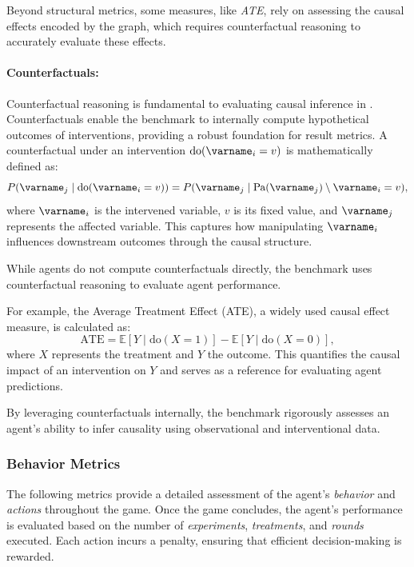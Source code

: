 \documentclass{article}
\begin{document}
            Beyond structural metrics, some measures, like \emph{ATE}, rely on assessing the causal effects encoded by the graph, which requires counterfactual reasoning to accurately evaluate these effects.

            \paragraph{Counterfactuals:}
                Counterfactual reasoning is fundamental to evaluating causal inference in \game. 
                Counterfactuals enable the benchmark to internally compute hypothetical outcomes of interventions, providing a robust foundation for result metrics. 
                A counterfactual under an intervention $\text{do}(\varname_i = v)$ is mathematically defined as:
                    \begin{equation*}
                        P(\varname_j \mid \text{do}(\varname_i = v)) = P(\varname_j \mid \text{Pa}(\varname_j) \setminus \varname_i = v),
                    \end{equation*}
                where $\varname_i$ is the intervened variable, $v$ is its fixed value, and $\varname_j$ represents the affected variable. 
                This captures how manipulating $\varname_i$ influences downstream outcomes through the causal structure.

                While agents do not compute counterfactuals directly, the benchmark uses counterfactual reasoning to evaluate agent performance. 

                For example, the Average Treatment Effect (ATE), a widely used causal effect measure, is calculated as:
                    \begin{equation*}
                        \text{ATE} = \mathbb{E}[Y \mid \text{do}(X = 1)] - \mathbb{E}[Y \mid \text{do}(X = 0)],
                    \end{equation*}
                where $X$ represents the treatment and $Y$ the outcome. 
                This quantifies the causal impact of an intervention on $ Y $ and serves as a reference for evaluating agent predictions.

                By leveraging counterfactuals internally, the benchmark rigorously assesses an agent's ability to infer causality using observational and interventional data. 



        \subsubsection{Behavior Metrics}
            The following metrics provide a detailed assessment of the agent’s \emph{behavior} and \emph{actions} throughout the game. 
            Once the game concludes, the agent's performance is evaluated based on the number of \emph{experiments}, \emph{treatments}, and \emph{rounds} executed. 
            Each action incurs a penalty, ensuring that efficient decision-making is rewarded.
\end{document}
